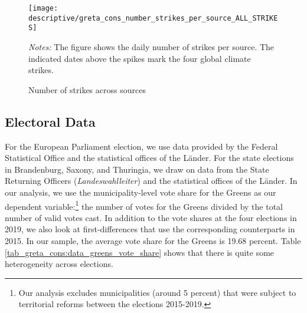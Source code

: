 \begin{figure}[t]\centering
	\caption{Number of strikes across sources}\label{fig_greta_cons:number_strikes_per_source}
	\texttt{[image: descriptive/greta\_cons\_number\_strikes\_per\_source\_ALL\_STRIKES]}
	\begin{minipage}{0.8\linewidth}
		\scriptsize{\emph{Notes:} The figure shows the daily number of strikes per source. The indicated dates above the spikes mark the four global climate strikes.}
	\end{minipage}
\end{figure}






\subsection{Electoral Data}
For the European Parliament election, we use data provided by the Federal Statistical Office and the statistical offices of the Länder. For the state elections in Brandenburg, Saxony, and Thuringia, we draw on data from the State Returning Officers (\textit{Landeswahlleiter}) and the statistical offices of the Länder. In our analysis, we use the municipality-level vote share for the Greens as our dependent variable:\footnote{Our analysis excludes municipalities (around 5 percent) that were subject to territorial reforms between the elections 2015-2019.} the number of votes for the Greens divided by the total number of valid votes cast. In addition to the vote shares at the four elections in 2019, we also look at first-differences that use the corresponding counterparts in 2015. In our sample, the average vote share for the Greens is 19.68 percent. Table \ref{tab_greta_cons:data_greens_vote_share} shows that there is quite some heterogeneity across elections.




